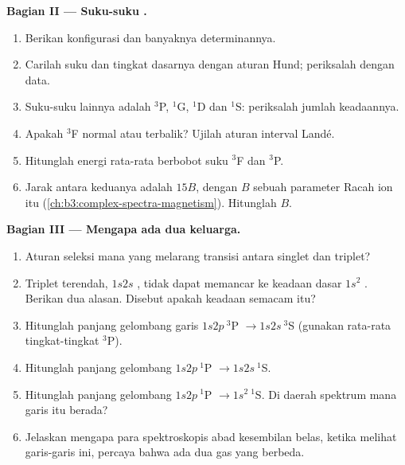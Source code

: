 \begin{problem}
\medskip\noindent\textbf{Bagian II --- Suku-suku .}
\begin{enumerate}[resume, beginpenalty=10000]
  \item Berikan konfigurasi  dan banyaknya determinannya.
  \item Carilah suku dan tingkat dasarnya dengan aturan Hund; periksalah
        dengan data.
  \item Suku-suku lainnya adalah ${}^3$P, ${}^1$G, ${}^1$D dan ${}^1$S: periksalah
        jumlah keadaannya.
  \item Apakah  ${}^3$F normal atau terbalik? Ujilah aturan
        interval Landé.
  \item Hitunglah energi rata-rata berbobot suku ${}^3$F dan ${}^3$P.
  \item Jarak antara keduanya adalah $15B$, dengan $B$ sebuah parameter Racah
        ion itu (\cref{ch:b3:complex-spectra-magnetism}). Hitunglah $B$.
\end{enumerate}

\medskip\noindent\textbf{Bagian III --- Mengapa ada dua keluarga.}
\begin{enumerate}[resume, beginpenalty=10000]
  \item Aturan seleksi mana yang melarang transisi antara singlet dan
        triplet?
  \item Triplet terendah, $1s2s$ , tidak dapat memancar ke
        keadaan dasar $1s^2$ . Berikan dua alasan. Disebut
        apakah keadaan semacam itu?
  \item Hitunglah panjang gelombang garis $1s2p\ {}^3$P $\to 1s2s\ {}^3$S
        (gunakan rata-rata tingkat-tingkat ${}^3$P).
  \item Hitunglah panjang gelombang $1s2p\ {}^1$P $\to 1s2s\ {}^1$S.
  \item Hitunglah panjang gelombang $1s2p\ {}^1$P $\to 1s^2\ {}^1$S. Di daerah
        spektrum mana garis itu berada?
  \item Jelaskan mengapa para spektroskopis abad kesembilan belas, ketika
        melihat garis-garis ini, percaya bahwa ada dua gas yang berbeda.
\end{enumerate}


\end{problem}
